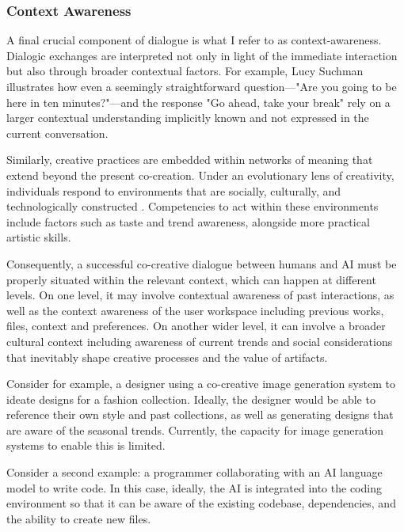 \subsubsection{Context Awareness}

A final crucial component of dialogue is what I refer to as context-awareness. Dialogic exchanges are interpreted not only in light of the immediate interaction but also through broader contextual factors. For example, Lucy Suchman \cite{Suchman2006-bs} illustrates how even a seemingly straightforward question—"Are you going to be here in ten minutes?"—and the response "Go ahead, take your break" rely on a larger contextual understanding implicitly known and not expressed in the current conversation. 

Similarly, creative practices are embedded within networks of meaning that extend beyond the present co-creation. Under an evolutionary lens of creativity, individuals respond to environments that are socially, culturally, and technologically constructed \cite{Bown2021-os}. Competencies to act within these environments include factors such as taste and trend awareness, alongside more practical artistic skills.

Consequently, a successful co-creative dialogue between humans and AI must be properly situated within the relevant context, which can happen at different levels. On one level, it may involve contextual awareness of past interactions, as well as the context awareness of the user workspace including previous works, files, context and preferences. On another wider level, it can involve a broader cultural context including awareness of current trends and social considerations that inevitably shape creative processes and the value of artifacts.

Consider for example, a designer using a co-creative image generation system to ideate designs for a fashion collection. Ideally, the designer would be able to reference their own style and past collections, as well as generating designs that are aware of the seasonal trends. Currently, the capacity for image generation systems to enable this is limited.

Consider a second example: a programmer collaborating with an AI language model to write code. In this case, ideally, the AI is integrated into the coding environment so that it can be aware of the existing codebase, dependencies, and the ability to create new files. 

